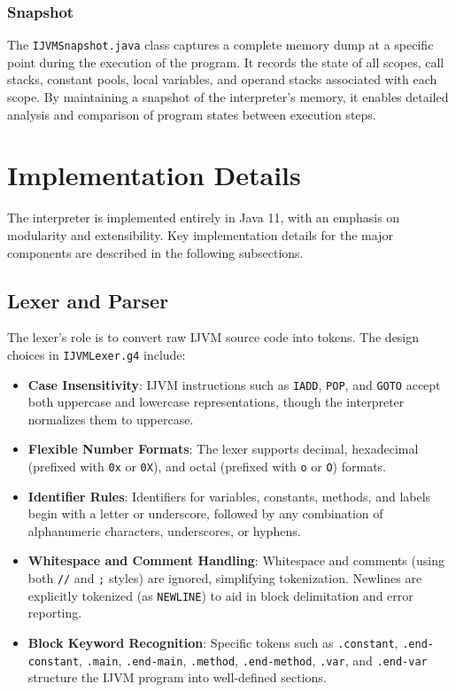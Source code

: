\documentclass[11pt]{article}
\begin{document}
\subsubsection{Snapshot}
The \texttt{IJVMSnapshot.java} class captures a complete memory dump at a specific point during the execution of the program. It records the state of all scopes, call stacks, constant pools, local variables, and operand stacks associated with each scope. By maintaining a snapshot of the interpreter's memory, it enables detailed analysis and comparison of program states between execution steps.

\section{Implementation Details}
The interpreter is implemented entirely in Java 11, with an emphasis on modularity and extensibility. Key implementation details for the major components are described in the following subsections.

\subsection{Lexer and Parser}
The lexer's role is to convert raw IJVM source code into tokens. The design choices in \texttt{IJVMLexer.g4} include:

\begin{itemize}
    \item \textbf{Case Insensitivity}: IJVM instructions such as \texttt{IADD}, \texttt{POP}, and \texttt{GOTO} accept both uppercase and lowercase representations, though the interpreter normalizes them to uppercase.
    \item \textbf{Flexible Number Formats}: The lexer supports decimal, hexadecimal (prefixed with \texttt{0x} or \texttt{0X}), and octal (prefixed with \texttt{o} or \texttt{O}) formats.
    \item \textbf{Identifier Rules}: Identifiers for variables, constants, methods, and labels begin with a letter or underscore, followed by any combination of alphanumeric characters, underscores, or hyphens.
    \item \textbf{Whitespace and Comment Handling}: Whitespace and comments (using both \texttt{//} and \texttt{;} styles) are ignored, simplifying tokenization. Newlines are explicitly tokenized (as \texttt{NEWLINE}) to aid in block delimitation and error reporting.
    \item \textbf{Block Keyword Recognition}: Specific tokens such as \texttt{.constant}, \texttt{.end-constant}, \texttt{.main}, \texttt{.end-main}, \texttt{.method}, \texttt{.end-method}, \texttt{.var}, and \texttt{.end-var} structure the IJVM program into well-defined sections.
\end{itemize}
\end{document}
